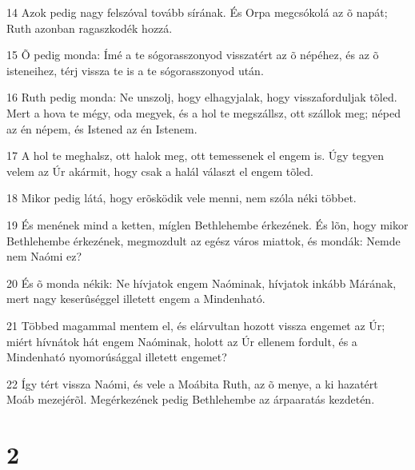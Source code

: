 \par 14 Azok pedig nagy felszóval tovább sírának. És Orpa megcsókolá az õ napát; Ruth azonban ragaszkodék hozzá.
\par 15 Õ pedig monda: Ímé a te sógorasszonyod visszatért az õ népéhez, és az õ isteneihez, térj vissza te is a te sógorasszonyod után.
\par 16 Ruth pedig monda: Ne unszolj, hogy elhagyjalak, hogy visszaforduljak tõled. Mert a hova te mégy, oda megyek, és a hol te megszállsz, ott szállok meg; néped az én népem, és Istened az én Istenem.
\par 17 A hol te meghalsz, ott halok meg, ott temessenek el engem is. Úgy tegyen velem az Úr akármit, hogy csak a halál választ el engem tõled.
\par 18 Mikor pedig látá, hogy erõsködik vele menni, nem szóla néki többet.
\par 19 És menének mind a ketten, míglen Bethlehembe érkezének. És lõn, hogy mikor Bethlehembe érkezének, megmozdult az egész város miattok, és mondák: Nemde nem Naómi ez?
\par 20 És õ monda nékik: Ne hívjatok engem Naóminak, hívjatok inkább Márának, mert nagy keserûséggel illetett engem a Mindenható.
\par 21 Többed magammal mentem el, és elárvultan hozott vissza engemet az Úr; miért hívnátok hát engem Naóminak, holott az Úr ellenem fordult, és a Mindenható nyomorúsággal illetett engemet?
\par 22 Így tért vissza Naómi, és vele a Moábita Ruth, az õ menye, a ki hazatért Moáb mezejérõl. Megérkezének pedig Bethlehembe az árpaaratás kezdetén.

\chapter{2}

